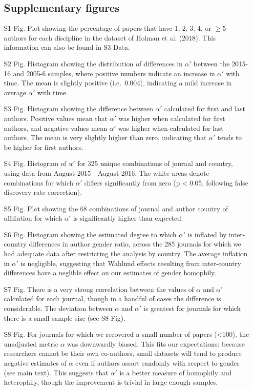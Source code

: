 \documentclass[12pt,]{article}
\begin{document}
\subsection{Supplementary figures}\label{supplementary-figures}

S1 Fig. Plot showing the percentage of papers that have 1, 2, 3, 4, or
\({\ge}5\) authors for each discipline in the dataset of Holman et al.
(2018). This information can also be found in S3 Data.

S2 Fig. Histogram showing the distribution of differences in \(\alpha'\)
between the 2015-16 and 2005-6 samples, where positive numbers indicate
an increase in \(\alpha'\) with time. The mean is slightly positive
(i.e.~0.004), indicating a mild increase in average \(\alpha'\) with
time.

S3 Fig. Histogram showing the difference between \(\alpha'\) calculated
for first and last authors. Positive values mean that \(\alpha'\) was
higher when calculated for first authors, and negative values mean
\(\alpha'\) was higher when calculated for last authors. The mean is
very slightly higher than zero, indicating that \(\alpha'\) tends to be
higher for first authors.

S4 Fig. Histogram of \(\alpha'\) for 325 unique combinations of journal
and country, using data from August 2015 - August 2016. The white areas
denote combinations for which \(\alpha'\) differs significantly from
zero (p \textless{} 0.05, following false discovery rate correction).

S5 Fig. Plot showing the 68 combinations of journal and author country
of affiliation for which \(\alpha'\) is significantly higher than
expected.

S6 Fig. Histogram showing the estimated degree to which \(\alpha'\) is
inflated by inter-country differences in author gender ratio, across the
285 journals for which we had adequate data after restricting the
analysis by country. The average inflation in \(\alpha'\) is negligible,
suggesting that Wahlund effects resulting from inter-country differences
have a neglible effect on our estimates of gender homophily.

S7 Fig. There is a very strong correlation between the values of
\(\alpha\) and \(\alpha'\) calculated for each journal, though in a
handful of cases the difference is considerable. The deviation between
\(\alpha\) and \(\alpha'\) is greatest for journals for which there is a
small sample size (see S8 Fig).

S8 Fig. For journals for which we recovered a small number of papers
(\textless{}100), the unadjusted metric \(\alpha\) was downwardly
biased. This fits our expectations: because researchers cannot be their
own co-authors, small datasets will tend to produce negative estimates
of \(\alpha\) even if authors assort randomly with respect to gender
(see main text). This suggests that \(\alpha'\) is a better measure of
homophily and heterophily, though the improvement is trivial in large
enough samples.
\end{document}
